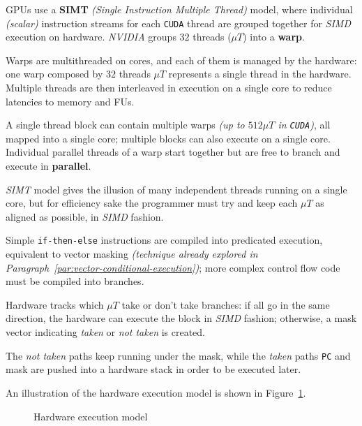 \documentclass[english]{article}
\begin{document}
\bigskip
GPUs use a \textbf{SIMT} \textit{(Single Instruction Multiple Thread)} model, where individual \textit{(scalar)} instruction streams for each \texttt{CUDA} thread are grouped together for \textit{SIMD} execution on hardware.
\textit{NVIDIA} groups \(32\) threads (\(\mu T\)) into a \textbf{warp}.

Warps are multithreaded on cores, and each of them is managed by the hardware:
one warp composed by \(32\) threads \textit{\(\mu T\)} represents a single thread in the hardware.
Multiple threads are then interleaved in execution on a single core to reduce latencies to memory and FUs.

A single thread block can contain multiple warps \textit{(up to \(512 \mu T\) in \texttt{CUDA})}, all mapped into a single core;
multiple blocks can also execute on a single core.
Individual parallel threads of a warp start together but are free to branch and execute in \textbf{parallel}.

\textit{SIMT} model gives the illusion of many independent threads running on a single core, but for efficiency sake the programmer must try and keep each \(\mu T\) as aligned as possible, in \textit{SIMD} fashion.

\bigskip
Simple \texttt{if-then-else} instructions are compiled into predicated execution, equivalent to vector masking \textit{(technique already explored in Paragraph~\ref{par:vector-conditional-execution})};
more complex control flow code must be compiled into branches.

Hardware tracks which \(\mu T\) take or don't take branches:
if all go in the same direction, the hardware can execute the block in \textit{SIMD} fashion;
otherwise, a mask vector indicating \textit{taken} or \textit{not taken} is created.

The \textit{not taken} paths keep running under the mask, while the \textit{taken} paths \texttt{PC} and mask are pushed into a hardware stack in order to be executed later.

\bigskip
An illustration of the hardware execution model is shown in Figure~\ref{fig:gpu-hardware-model}.

\begin{figure}[htbp]
  \bigskip
  \centering
  \caption{Hardware execution model}
  \label{fig:gpu-hardware-model}
  \bigskip
\end{figure}
\end{document}

